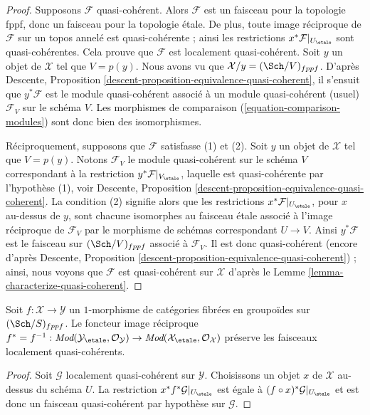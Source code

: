 \begin{proof}
Supposons $\mathcal{F}$ quasi-cohérent. Alors $\mathcal{F}$ est un faisceau
pour la topologie fppf, donc un faisceau pour la topologie \'etale. De plus,
toute image réciproque de $\mathcal{F}$ sur un topos annelé est quasi-cohérente ; ainsi
les restrictions $x^*\mathcal{F}|_{U_\etale}$ sont quasi-cohérentes.
Cela prouve que $\mathcal{F}$ est localement quasi-cohérent.
Soit $y$ un objet de $\mathcal{X}$ tel que $V = p(y)$.
Nous avons vu que $\mathcal{X}/y = (\Sch/V)_{fppf}$. D'après
Descente, Proposition \ref{descent-proposition-equivalence-quasi-coherent},
il s'ensuit que $y^*\mathcal{F}$ est le module quasi-cohérent
associé à un module quasi-cohérent (usuel) $\mathcal{F}_V$ sur
le schéma $V$. Les morphismes de comparaison
(\ref{equation-comparison-modules}) sont donc bien des isomorphismes.

\medskip\noindent
Réciproquement, supposons que $\mathcal{F}$ satisfasse (1) et (2).
Soit $y$ un objet de $\mathcal{X}$ tel que $V = p(y)$. Notons
$\mathcal{F}_V$ le module quasi-cohérent sur
le schéma $V$ correspondant à la restriction
$y^*\mathcal{F}|_{V_\etale}$, laquelle est quasi-cohérente par
l'hypothèse (1), voir
Descente, Proposition \ref{descent-proposition-equivalence-quasi-coherent}.
La condition (2) signifie alors que les restrictions
$x^*\mathcal{F}|_{U_\etale}$, pour $x$ au-dessus de $y$, sont chacune
isomorphes au faisceau \'etale associé à l'image réciproque de $\mathcal{F}_V$
par le morphisme de schémas correspondant $U \to V$.
Ainsi $y^*\mathcal{F}$ est le faisceau sur $(\Sch/V)_{fppf}$
associé à $\mathcal{F}_V$. Il est donc quasi-cohérent (encore d'après
Descente, Proposition \ref{descent-proposition-equivalence-quasi-coherent}) ;
ainsi, nous voyons que $\mathcal{F}$ est quasi-cohérent sur $\mathcal{X}$ d'après le
Lemme \ref{lemma-characterize-quasi-coherent}.
\end{proof}

\begin{lemma}
\label{lemma-pullback-lqc}
Soit $f : \mathcal{X} \to \mathcal{Y}$ un $1$-morphisme de catégories
fibrées en groupoïdes sur $(\Sch/S)_{fppf}$. Le foncteur image réciproque
$f^* = f^{-1} :
\textit{Mod}(\mathcal{Y}_\etale, \mathcal{O}_\mathcal{Y})
\to
\textit{Mod}(\mathcal{X}_\etale, \mathcal{O}_\mathcal{X})$
préserve les faisceaux localement quasi-cohérents.
\end{lemma}

\begin{proof}
Soit $\mathcal{G}$ localement quasi-cohérent sur $\mathcal{Y}$.
Choisissons un objet $x$ de $\mathcal{X}$ au-dessus du schéma $U$.
La restriction $x^*f^*\mathcal{G}|_{U_\etale}$ est égale à
$(f \circ x)^*\mathcal{G}|_{U_\etale}$
et est donc un faisceau quasi-cohérent par hypothèse sur $\mathcal{G}$.
\end{proof}

